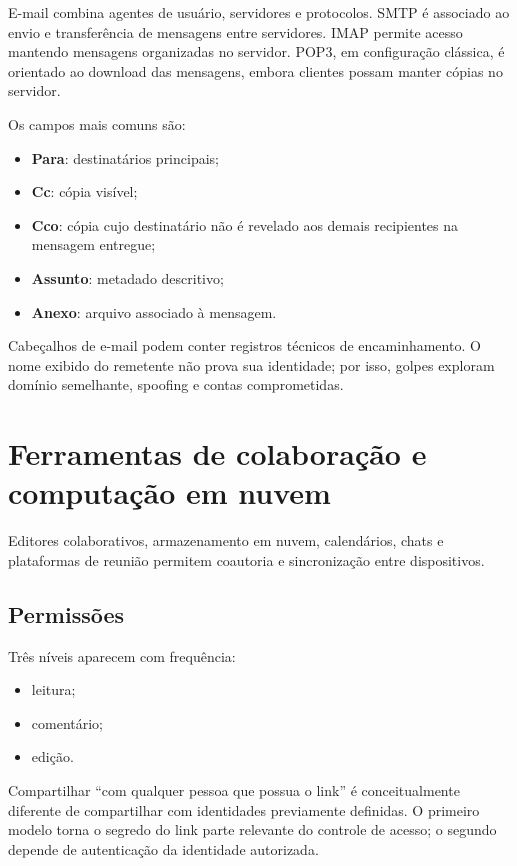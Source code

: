 E-mail combina agentes de usuário, servidores e protocolos. SMTP é associado ao envio e transferência de mensagens entre servidores. IMAP permite acesso mantendo mensagens organizadas no servidor. POP3, em configuração clássica, é orientado ao download das mensagens, embora clientes possam manter cópias no servidor.

Os campos mais comuns são:
\begin{itemize}
\item \textbf{Para}: destinatários principais;
\item \textbf{Cc}: cópia visível;
\item \textbf{Cco}: cópia cujo destinatário não é revelado aos demais recipientes na mensagem entregue;
\item \textbf{Assunto}: metadado descritivo;
\item \textbf{Anexo}: arquivo associado à mensagem.
\end{itemize}

Cabeçalhos de e-mail podem conter registros técnicos de encaminhamento. O nome exibido do remetente não prova sua identidade; por isso, golpes exploram domínio semelhante, spoofing e contas comprometidas.

\section{Ferramentas de colaboração e computação em nuvem}

Editores colaborativos, armazenamento em nuvem, calendários, chats e plataformas de reunião permitem coautoria e sincronização entre dispositivos.

\subsection{Permissões}

Três níveis aparecem com frequência:
\begin{itemize}
\item leitura;
\item comentário;
\item edição.
\end{itemize}

Compartilhar ``com qualquer pessoa que possua o link'' é conceitualmente diferente de compartilhar com identidades previamente definidas. O primeiro modelo torna o segredo do link parte relevante do controle de acesso; o segundo depende de autenticação da identidade autorizada.


